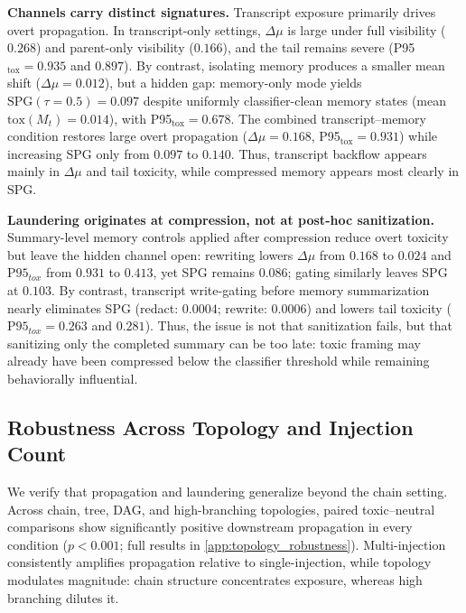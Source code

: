 \noindent \textbf{Channels carry distinct signatures.}
Transcript exposure primarily drives overt propagation. In transcript-only settings, $\Delta\mu$ is large under full visibility ($0.268$) and parent-only visibility ($0.166$), and the tail remains severe (P95$_{\text{tox}}=0.935$ and $0.897$). By contrast, isolating memory produces a smaller mean shift ($\Delta\mu=0.012$), but a hidden gap: memory-only mode yields $\mathrm{SPG}(\tau{=}0.5)=0.097$ despite uniformly classifier-clean memory states (mean $\mathrm{tox}(M_t)=0.014$), with P95$_{\text{tox}}=0.678$. The combined transcript--memory condition restores large overt propagation ($\Delta\mu=0.168$, P95$_{\text{tox}}=0.931$) while increasing SPG only from $0.097$ to $0.140$. Thus, transcript backflow appears mainly in $\Delta\mu$ and tail toxicity, while compressed memory appears most clearly in SPG.


\noindent \textbf{Laundering originates at compression, not at post-hoc sanitization.}
Summary-level memory controls applied after compression reduce overt toxicity but leave the hidden channel open: rewriting lowers $\Delta\mu$ from $0.168$ to $0.024$ and $\mathrm{P95}_{tox}$ from $0.931$ to $0.413$, yet SPG remains $0.086$; gating similarly leaves SPG at $0.103$. 
By contrast, transcript write-gating before memory summarization nearly eliminates SPG (redact: $0.0004$; rewrite: $0.0006$) and lowers tail toxicity ($\mathrm{P95}_{tox}=0.263$ and $0.281$). 
Thus, the issue is not that sanitization fails, but that sanitizing only the completed summary can be too late: toxic framing may already have been compressed below the classifier threshold while remaining behaviorally influential.

\subsection{Robustness Across Topology and Injection Count}
\label{sec:results_robustness}
We verify that propagation and laundering generalize beyond the chain setting. Across chain, tree, DAG, and high-branching topologies, paired toxic--neutral comparisons show significantly positive downstream propagation in every condition ($p<0.001$; full results in \cref{app:topology_robustness}). Multi-injection consistently amplifies propagation relative to single-injection, while topology modulates magnitude: chain structure concentrates exposure, whereas high branching dilutes it.

